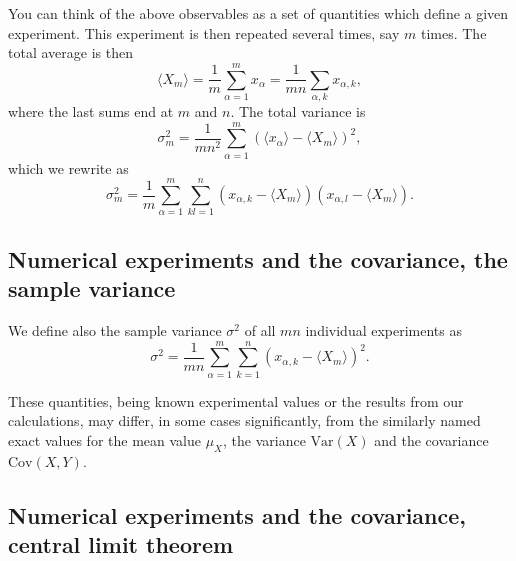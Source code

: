 \documentclass[%
oneside,                 %
final,                   %
10pt]{article}
\newenvironment{block_mdfboxadmon}[1][]{
\begin{block_mdfboxmdframed}[frametitle=#1]
}
{
\end{block_mdfboxmdframed}
}
\begin{document}
\begin{block_mdfboxadmon}[]
You can think of the above observables as a set of quantities which define
a given experiment. This experiment is then repeated several times, say $m$ times.
The total average is then
\begin{equation}
\langle X_m \rangle= \frac{1}{m}\sum_{\alpha=1}^mx_{\alpha}=\frac{1}{mn}\sum_{\alpha, k} x_{\alpha,k},
\label{eq:exptmean}
\end{equation}
where the last sums end at $m$ and $n$.
The total variance is
\begin{equation*}
\sigma^2_m= \frac{1}{mn^2}\sum_{\alpha=1}^m(\langle x_{\alpha} \rangle-\langle X_m \rangle)^2,
\end{equation*}
which we rewrite as
\begin{equation}
\sigma^2_m=\frac{1}{m}\sum_{\alpha=1}^m\sum_{kl=1}^n (x_{\alpha,k}-\langle X_m \rangle)(x_{\alpha,l}-\langle X_m \rangle).
\label{eq:exptvariance}
\end{equation}
\end{block_mdfboxadmon} %



\subsection{Numerical experiments and the covariance, the sample variance}

\begin{block_mdfboxadmon}[]

We define also the sample variance $\sigma^2$ of all $mn$ individual experiments as
\begin{equation}
\sigma^2=\frac{1}{mn}\sum_{\alpha=1}^m\sum_{k=1}^n (x_{\alpha,k}-\langle X_m \rangle)^2.
\label{eq:sampleexptvariance}
\end{equation}



These quantities, being known experimental values or the results from our calculations, 
may differ, in some cases
significantly,  from the similarly named
exact values for the mean value $\mu_X$, the variance $\mathrm{Var}(X)$
and the covariance $\mathrm{Cov}(X,Y)$.
\end{block_mdfboxadmon} %



\subsection{Numerical experiments and the covariance, central limit theorem}
\end{document}
